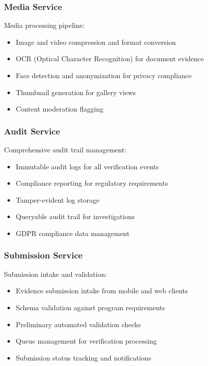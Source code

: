 \documentclass[11pt,a4paper]{article}
\begin{document}
\subsubsection{Media Service}

Media processing pipeline:
\begin{itemize}
  \item Image and video compression and format conversion
  \item OCR (Optical Character Recognition) for document evidence
  \item Face detection and anonymization for privacy compliance
  \item Thumbnail generation for gallery views
  \item Content moderation flagging
\end{itemize}

\subsubsection{Audit Service}

Comprehensive audit trail management:
\begin{itemize}
  \item Immutable audit logs for all verification events
  \item Compliance reporting for regulatory requirements
  \item Tamper-evident log storage
  \item Queryable audit trail for investigations
  \item GDPR compliance data management
\end{itemize}

\subsubsection{Submission Service}

Submission intake and validation:
\begin{itemize}
  \item Evidence submission intake from mobile and web clients
  \item Schema validation against program requirements
  \item Preliminary automated validation checks
  \item Queue management for verification processing
  \item Submission status tracking and notifications
\end{itemize}
\end{document}
